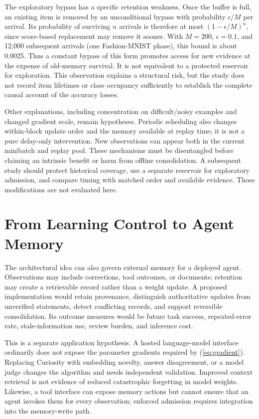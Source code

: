 \documentclass[conference]{IEEEtran}
\begin{document}
The exploratory bypass has a specific retention weakness. Once the buffer is full, an existing item is removed by an unconditional bypass with probability $\epsilon/M$ per arrival. Its probability of surviving $n$ arrivals is therefore at most $(1-\epsilon/M)^n$, since score-based replacement may remove it sooner. With $M=200$, $\epsilon=0.1$, and 12,000 subsequent arrivals (one Fashion-MNIST phase), this bound is about 0.0025. Thus a constant bypass of this form promotes access for new evidence at the expense of old-memory survival. It is not equivalent to a protected reservoir for exploration. This observation explains a structural risk, but the study does not record item lifetimes or class occupancy sufficiently to establish the complete causal account of the accuracy losses.

Other explanations, including concentration on difficult/noisy examples and changed gradient scale, remain hypotheses. Periodic scheduling also changes within-block update order and the memory available at replay time; it is not a pure delay-only intervention. New observations can appear both in the current minibatch and replay pool. These mechanisms must be disentangled before claiming an intrinsic benefit or harm from offline consolidation. A subsequent study should protect historical coverage, use a separate reservoir for exploratory admission, and compare timing with matched order and available evidence. Those modifications are not evaluated here.




\section{From Learning Control to Agent Memory}
The architectural idea can also govern external memory for a deployed agent. Observations may include corrections, tool outcomes, or documents; retention may create a retrievable record rather than a weight update. A proposed implementation would retain provenance, distinguish authoritative updates from unverified statements, detect conflicting records, and support reversible consolidation. Its outcome measures would be future task success, repeated-error rate, stale-information use, review burden, and inference cost.

This is a separate application hypothesis. A hosted language-model interface ordinarily does not expose the parameter gradients required by (\ref{eq:gradient}). Replacing Curiosity with embedding novelty, answer disagreement, or a model judge changes the algorithm and needs independent validation. Improved context retrieval is not evidence of reduced catastrophic forgetting in model weights. Likewise, a tool interface can expose memory actions but cannot ensure that an agent invokes them for every observation; enforced admission requires integration into the memory-write path.
\end{document}
